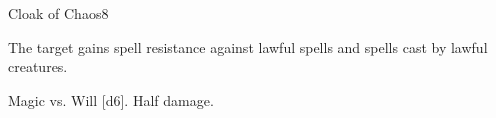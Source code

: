 \begin{spellsection}{Cloak of Chaos}{8}
    \begin{spellheader}
    \end{spellheader}
    \begin{spellcontent}
        \begin{spelltargetinginfo}
        \end{spelltargetinginfo}
        \begin{spelleffects}
            \spelleffect The target gains spell resistance against lawful spells and spells cast by lawful creatures.
            \spelldur \durshort \dismissable
        \end{spelleffects}
    \end{spellcontent}
    \begin{spellsubcontent}
        \begin{spelltargetinginfo}
        \end{spelltargetinginfo}
        \begin{spelleffects}
            \begin{spellattack}{Magic vs. Will}
                \spellsuccess {}[d6].
                \spellfailure Half damage.
            \end{spellattack}
        \end{spelleffects}
    \end{spellsubcontent}
    \begin{spellfooter}
        \miscastexplode
    \end{spellfooter}
\end{spellsection}

